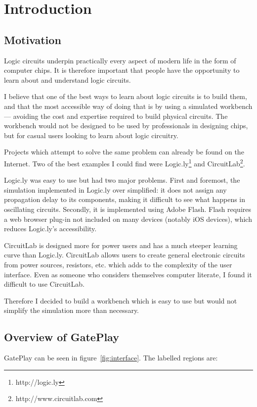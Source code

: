 \chapter{Introduction}

\section{Motivation}
Logic circuits underpin practically every aspect of modern life in the form of computer chips. It is therefore important that people have the opportunity to learn about and understand logic circuits.

I believe that one of the best ways to learn about logic circuits is to build them, and that the most accessible way of doing that is by using a simulated workbench --- avoiding the cost and expertise required to build physical circuits. The workbench would not be designed to be used by professionals in designing chips, but for casual users looking to learn about logic circuitry.

Projects which attempt to solve the same problem can already be found on the Internet. Two of the best examples I could find were Logic.ly\footnote{http://logic.ly} and CircuitLab\footnote{http://www.circuitlab.com}.

Logic.ly was easy to use but had two major problems. First and foremost, the simulation implemented in Logic.ly over simplified: it does not assign any propagation delay to its components, making it difficult to see what happens in oscillating circuits. Secondly, it is implemented using Adobe Flash. Flash requires a web browser plug-in not included on many devices (notably iOS devices), which reduces Logic.ly's accessibility.

CircuitLab is designed more for power users and has a much steeper learning curve than Logic.ly. CircuitLab allows users to create general electronic circuits from power sources, resistors, etc. which adds to the complexity of the user interface. Even as someone who considers themselves computer literate, I found it difficult to use CircuitLab.

Therefore I decided to build a workbench which is easy to use but would not simplify the simulation more than necessary.

\section{Overview of GatePlay}
GatePlay can be seen in figure~\ref{fig:interface}. The labelled regions are:

